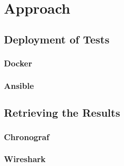 \chapter{Approach}\label{chapter:approach}

\section{Deployment of Tests}

\subsection{Docker}
\subsection{Ansible}

\section{Retrieving the Results}
\subsection{Chronograf}
\subsection{Wireshark}